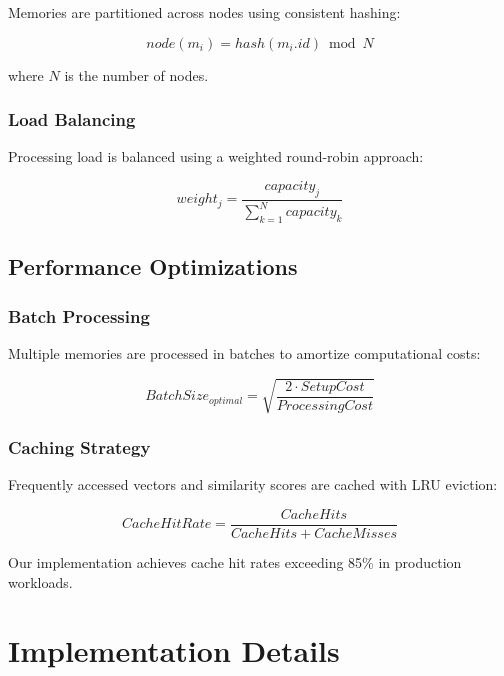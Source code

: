 \documentclass[12pt,a4paper]{article}
\begin{document}
Memories are partitioned across nodes using consistent hashing:

\begin{equation}
node(m_i) = hash(m_i.id) \bmod N
\end{equation}

where $N$ is the number of nodes.

\subsubsection{Load Balancing}

Processing load is balanced using a weighted round-robin approach:

\begin{equation}
weight_j = \frac{capacity_j}{\sum_{k=1}^N capacity_k}
\end{equation}

\subsection{Performance Optimizations}

\subsubsection{Batch Processing}

Multiple memories are processed in batches to amortize computational costs:

\begin{equation}
BatchSize_{optimal} = \sqrt{\frac{2 \cdot SetupCost}{ProcessingCost}}
\end{equation}

\subsubsection{Caching Strategy}

Frequently accessed vectors and similarity scores are cached with LRU eviction:

\begin{equation}
CacheHitRate = \frac{CacheHits}{CacheHits + CacheMisses}
\end{equation}

Our implementation achieves cache hit rates exceeding 85\% in production workloads.

\section{Implementation Details}
\end{document}

